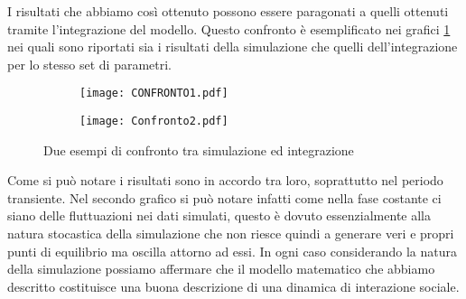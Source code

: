 I risultati che abbiamo così ottenuto possono essere paragonati a quelli ottenuti tramite l'integrazione del modello. Questo confronto è esemplificato nei grafici \ref{confromto} nei quali sono riportati sia i risultati della simulazione che quelli dell'integrazione per lo stesso set di parametri.\\ 
\begin{figure}[H]
	\centering
	\begin{subfigure}[H]{0.49\textwidth}
		\centering
		\texttt{[image: CONFRONTO1.pdf]}
	\end{subfigure}
	\hfill
	\begin{subfigure}[H]{0.49\textwidth}
		\centering
		\texttt{[image: Confronto2.pdf]}
	\end{subfigure}
	\caption{Due esempi di confronto tra simulazione ed integrazione}
	\label{confromto}
\end{figure}
Come si può notare i risultati sono in accordo tra loro, soprattutto nel periodo transiente. Nel secondo grafico si può notare infatti come nella fase costante ci siano delle fluttuazioni nei dati simulati, questo è dovuto essenzialmente alla natura stocastica della simulazione che non riesce quindi a generare veri e propri punti di equilibrio ma oscilla attorno ad essi. In ogni caso considerando la natura della simulazione possiamo affermare che il modello matematico che abbiamo descritto costituisce una buona descrizione di una dinamica di interazione sociale.
